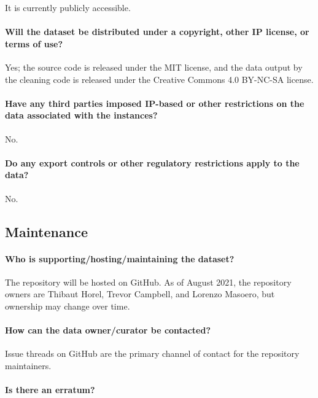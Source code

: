 It is currently publicly accessible.

\paragraph{Will the dataset be distributed under a copyright, other IP license, or terms of use?}

Yes; the source code is released under the MIT license, and the data output by the cleaning code is released under the Creative Commons 4.0 BY-NC-SA license.

\paragraph{Have any third parties imposed IP-based or other restrictions on the data associated with the instances?}

No.

\paragraph{Do any export controls or other regulatory restrictions apply to the data?}

No.

\subsection{Maintenance}

\paragraph{Who is supporting/hosting/maintaining the dataset?}

The repository will be hosted on GitHub. As of August 2021, the repository 
owners are Thibaut Horel, Trevor Campbell, and Lorenzo Masoero, but ownership may change over time.

\paragraph{How can the data owner/curator be contacted?}

Issue threads on GitHub are the primary channel of contact for the repository maintainers.

\paragraph{Is there an erratum?}


